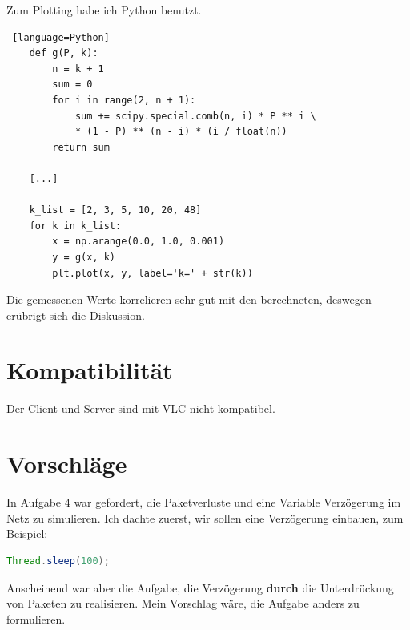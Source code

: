 \documentclass[11pt]{article}
\begin{document}
    \noindent
    Zum Plotting habe ich Python benutzt.

    \begin{lstlisting} [language=Python]
    def g(P, k):
        n = k + 1
        sum = 0
        for i in range(2, n + 1):
            sum += scipy.special.comb(n, i) * P ** i \
            * (1 - P) ** (n - i) * (i / float(n))
        return sum

    [...]

    k_list = [2, 3, 5, 10, 20, 48]
    for k in k_list:
        x = np.arange(0.0, 1.0, 0.001)
        y = g(x, k)
        plt.plot(x, y, label='k=' + str(k))
    \end{lstlisting}

    \noindent
    Die gemessenen Werte korrelieren sehr gut mit den berechneten, deswegen erübrigt sich die Diskussion.

    \section{Kompatibilität}
    Der Client und Server sind mit VLC nicht kompatibel.


    \section{Vorschläge}

    In Aufgabe 4 war gefordert, die Paketverluste und eine Variable Verzögerung im Netz zu simulieren.
    Ich dachte zuerst, wir sollen eine Verzögerung einbauen, zum Beispiel:

    \begin{lstlisting}[language=Java]
        Thread.sleep(100);
    \end{lstlisting}

    \noindent
    Anscheinend war aber die Aufgabe, die Verzögerung \textbf{durch} die Unterdrückung von Paketen zu realisieren.
    Mein Vorschlag wäre, die Aufgabe anders zu formulieren.
\end{document}
